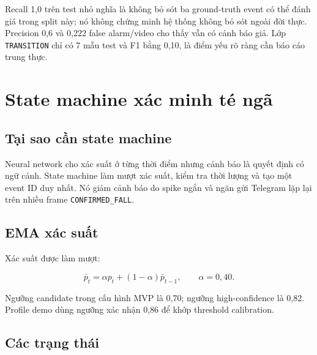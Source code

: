 \documentclass[12pt,a4paper,oneside]{report}
\newcommand{\code}[1]{\texttt{#1}}
\begin{document}
\begin{resultbox}
Recall 1,0 trên test nhỏ nghĩa là không bỏ sót ba ground-truth event có thể đánh
giá trong split này; nó không chứng minh hệ thống không bỏ sót ngoài đời thực.
Precision 0,6 và 0,222 false alarm/video cho thấy vẫn có cảnh báo giả. Lớp
\code{TRANSITION} chỉ có 7 mẫu test và F1 bằng 0,10, là điểm yếu rõ ràng cần báo
cáo trung thực.
\end{resultbox}

\chapter{State machine xác minh té ngã}

\section{Tại sao cần state machine}

Neural network cho xác suất ở từng thời điểm nhưng cảnh báo là quyết định có
ngữ cảnh. State machine làm mượt xác suất, kiểm tra thời lượng và tạo một event
ID duy nhất. Nó giảm cảnh báo do spike ngắn và ngăn gửi Telegram lặp lại trên
nhiều frame \code{CONFIRMED\_FALL}.

\section{EMA xác suất}

Xác suất được làm mượt:

\[
\bar p_t=\alpha p_t+(1-\alpha)\bar p_{t-1},\qquad \alpha=0,40.
\]

Ngưỡng candidate trong cấu hình MVP là 0,70; ngưỡng high-confidence là 0,82.
Profile demo dùng ngưỡng xác nhận 0,86 để khớp threshold calibration.

\section{Các trạng thái}
\end{document}
